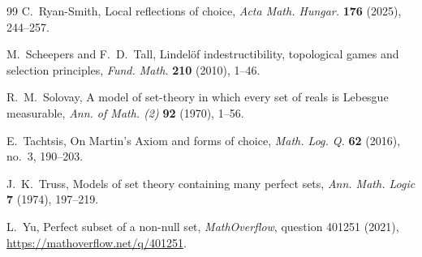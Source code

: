 \documentclass[11pt,reqno]{amsart}
\theoremstyle{plain}
\theoremstyle{definition}
\theoremstyle{remark}
\begin{document}
\begin{thebibliography}{99}
C.~Ryan-Smith,
Local reflections of choice,
\emph{Acta Math. Hungar.} \textbf{176} (2025), 244--257.

M.~Scheepers and F.~D.~Tall,
Lindel\"of indestructibility, topological games and selection principles,
\emph{Fund. Math.} \textbf{210} (2010), 1--46.

R.~M.~Solovay,
A model of set-theory in which every set of reals is Lebesgue measurable,
\emph{Ann. of Math. (2)} \textbf{92} (1970), 1--56.

E.~Tachtsis,
On Martin's Axiom and forms of choice,
\emph{Math. Log. Q.} \textbf{62} (2016), no.~3, 190--203.

J.~K.~Truss,
Models of set theory containing many perfect sets,
\emph{Ann. Math. Logic} \textbf{7} (1974), 197--219.

L.~Yu,
Perfect subset of a non-null set,
\emph{MathOverflow}, question 401251 (2021),
\url{https://mathoverflow.net/q/401251}.

\end{thebibliography}
\end{document}
